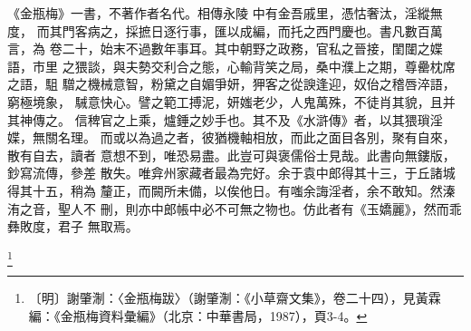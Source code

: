 《金瓶梅》一書，不著作者名代。相傳永陵
中有金吾戚里，憑怙奢汰，淫縱無度，
而其門客病之，採摭日逐行事，匯以成編，而托之西門慶也。書凡數百萬言，為
卷二十，始末不過數年事耳。其中朝野之政務，官私之晉接，閨闥之媟語，市里
之猥談，與夫勢交利合之態，心輸背笑之局，桑中濮上之期，尊罍枕席之語，駔
驓之機械意智，粉黛之自媚爭妍，狎客之從諛逢迎，奴佁之稽唇淬語，窮極境象，
駴意快心。譬之範工搏泥，妍媸老少，人鬼萬殊，不徒肖其貌，且并其神傳之。
信稗官之上乘，爐錘之妙手也。其不及《水滸傳》者，以其猥瑣淫媟，無關名理。
而或以為過之者，彼猶機軸相放，而此之面目各別，聚有自來，散有自去，讀者
意想不到，唯恐易盡。此豈可與褒儒俗士見哉。此書向無鏤版，鈔寫流傳，參差
散失。唯弇州家藏者最為完好。余于袁中郎得其十三，于丘諸城得其十五，稍為
釐正，而闕所未備，以俟他日。有嗤余誨淫者，余不敢知。然溱洧之音，聖人不
刪，則亦中郎帳中必不可無之物也。仿此者有《玉嬌麗》，然而乖彝敗度，君子
無取焉。



\footnote{〔明〕謝肇淛：〈金瓶梅跋〉（謝肇淛：《小草齋文集》，卷二十四），見黃霖編：《金瓶梅資料彙編》（北京：中華書局，1987），頁3-4。}






